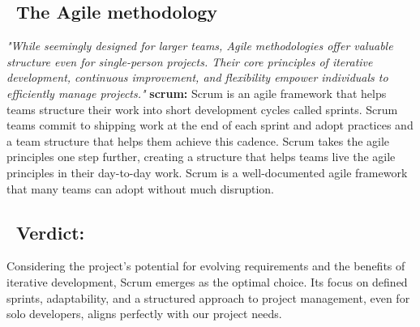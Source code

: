 \subsection*{ \textbullet\ The Agile methodology}
\emph{"While seemingly designed for larger teams, Agile methodologies offer valuable structure even for single-person projects. Their core principles of iterative development, continuous improvement, and flexibility empower individuals to efficiently manage projects."}\cite{webArticle2}
\textbf{scrum:} Scrum is an agile framework that helps teams structure their work into short development cycles called sprints. Scrum teams commit to shipping work at the end of each sprint and adopt practices and a team structure that helps them achieve this cadence. Scrum takes the agile principles one step further, creating a structure that helps teams live the agile principles in their day-to-day work. Scrum is a well-documented agile framework that many teams can adopt without much disruption.
\subsection*{ \textbullet\ Verdict:}
Considering the project's potential for evolving requirements and the benefits of iterative development, Scrum emerges as the optimal choice. Its focus on defined sprints, adaptability, and a structured approach to project management, even for solo developers, aligns perfectly with our project needs.

